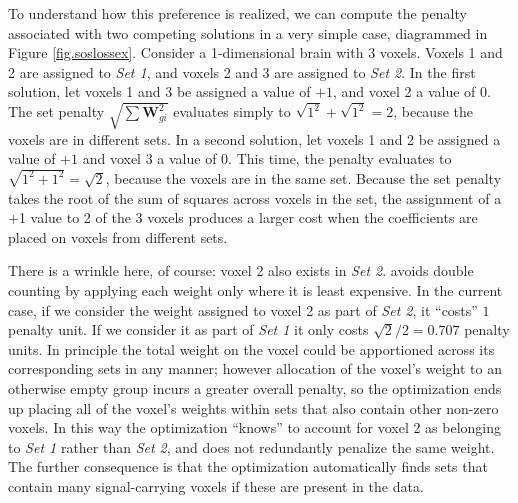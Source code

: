 To understand how this preference is realized, we can compute the penalty associated with two competing solutions in a very simple case, diagrammed in Figure \ref{fig.soslossex}. Consider a 1-dimensional brain with 3 voxels. Voxels 1 and 2 are assigned to {\em Set 1}, and voxels 2 and 3 are assigned to {\em Set 2}. In the first solution, let voxels 1 and 3 be assigned a value of $+1$, and voxel 2 a value of $0$. The set penalty $\sqrt{\sum{\mathbf{W}^2_{gi}}}$ evaluates simply to $\sqrt{1^2} + \sqrt{1^2}=2$, because the voxels are in different sets. In a second solution, let voxels 1 and 2 be assigned a value of $+1$ and voxel 3 a value of $0$. This time, the penalty evaluates to $\sqrt{1^2+1^2}=\sqrt{2}$, because the voxels are in the same set. Because the set penalty takes the root of the sum of squares across voxels in the set, the assignment of a +1 value to 2 of the 3 voxels produces a larger cost when the coefficients are placed on voxels from different sets. 

There is a wrinkle here, of course: voxel 2 also exists in {\em Set 2}. {\soslasso} avoids double counting by applying each weight only where it is least expensive.  In the current case, if we consider the weight assigned to voxel 2 as part of {\em Set 2}, it ``costs'' $1$ penalty unit. If we consider it as part of {\em Set 1} it only costs $\sqrt{2}/2=0.707$ penalty units. In principle the total weight on the voxel could be apportioned across its corresponding sets in any manner; however allocation of the voxel's weight to an otherwise empty group incurs a greater overall penalty, so the optimization ends up placing all of the voxel's weights within sets that also contain other non-zero voxels. In this way the optimization ``knows'' to account for voxel 2 as belonging to {\em Set 1} rather than {\em Set 2}, and does not redundantly penalize the same weight. The further consequence is that the optimization automatically finds sets that contain many signal-carrying voxels if these are present in the data.


